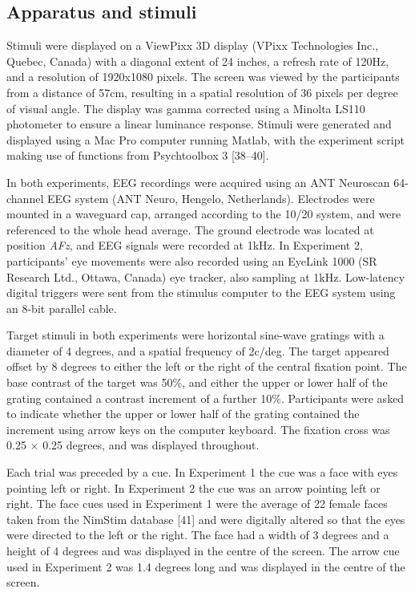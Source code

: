 \documentclass[
  letterpaper,
  DIV=11,
  numbers=noendperiod]{scrartcl}
\begin{document}
\subsection{Apparatus and stimuli}\label{apparatus-and-stimuli}

Stimuli were displayed on a ViewPixx 3D display (VPixx Technologies
Inc., Quebec, Canada) with a diagonal extent of 24 inches, a refresh
rate of 120Hz, and a resolution of 1920x1080 pixels. The screen was
viewed by the participants from a distance of 57cm, resulting in a
spatial resolution of 36 pixels per degree of visual angle. The display
was gamma corrected using a Minolta LS110 photometer to ensure a linear
luminance response. Stimuli were generated and displayed using a Mac Pro
computer running Matlab, with the experiment script making use of
functions from Psychtoolbox 3 {[}38--40{]}.

In both experiments, EEG recordings were acquired using an ANT Neuroscan
64-channel EEG system (ANT Neuro, Hengelo, Netherlands). Electrodes were
mounted in a waveguard cap, arranged according to the 10/20 system, and
were referenced to the whole head average. The ground electrode was
located at position \emph{AFz}, and EEG signals were recorded at 1kHz.
In Experiment 2, participants' eye movements were also recorded using an
EyeLink 1000 (SR Research Ltd., Ottawa, Canada) eye tracker, also
sampling at 1kHz. Low-latency digital triggers were sent from the
stimulus computer to the EEG system using an 8-bit parallel cable.

Target stimuli in both experiments were horizontal sine-wave gratings
with a diameter of 4 degrees, and a spatial frequency of 2c/deg. The
target appeared offset by 8 degrees to either the left or the right of
the central fixation point. The base contrast of the target was 50\%,
and either the upper or lower half of the grating contained a contrast
increment of a further 10\%. Participants were asked to indicate whether
the upper or lower half of the grating contained the increment using
arrow keys on the computer keyboard. The fixation cross was 0.25
\(\times\) 0.25 degrees, and was displayed throughout.

Each trial was preceded by a cue. In Experiment 1 the cue was a face
with eyes pointing left or right. In Experiment 2 the cue was an arrow
pointing left or right. The face cues used in Experiment 1 were the
average of 22 female faces taken from the NimStim database {[}41{]} and
were digitally altered so that the eyes were directed to the left or the
right. The face had a width of 3 degrees and a height of 4 degrees and
was displayed in the centre of the screen. The arrow cue used in
Experiment 2 was 1.4 degrees long and was displayed in the centre of the
screen.
\end{document}
